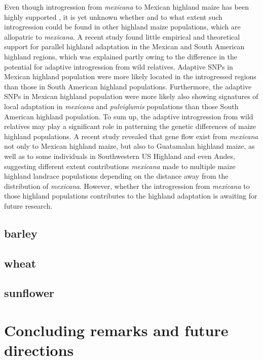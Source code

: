 \documentclass[11pt]{article}
\begin{document}
Even though introgression from \emph{mexicana} to Mexican highland maize has been highly supported \cite{hufford2013}, it is yet unknown whether and to what extent such introgression could be found in other highland maize populations, which are allopatric to \emph{mexicana}. 
A recent study \cite{Takuno2015} found little empirical and theoretical support for parallel highland adaptation in the Mexican and South American highland regions, which was explained partly owing to the difference in the potential for adaptive introgression from wild relatives.
Adaptive SNPs in Mexican highland population were more likely located in the introgressed regions than those in South American highland populations.
Furthermore, the adaptive SNPs in Mexican highland population were more likely also showing signatures of local adaptation in \emph{mexicana} and \emph {pulviglumis} populations than those South American highland population.
To sum up, the adaptive introgression from wild relatives may play a significant role in patterning the genetic differences of maize highland populations.
A recent study \cite{Wang2015manuscript} revealed that gene flow exist from \emph{mexicana} not only to Mexican highland maize, but also to Guatamalan highland maize, as well as to some individuals in Southwestern US Highland and even Andes, suggesting different extent contributions \emph{mexicana} made to multiple maize highland landrace populations depending on the distance away from the distribution of \emph{mexicana}. 
However, whether the introgression from \emph{mexicana} to those highland populations contributes to the highland adaptation is awaiting for future research. 
 
\subsection{barley}
\subsection{wheat}
\subsection{sunflower}

\section{Concluding remarks and future directions}



%
% 

\end{document}
